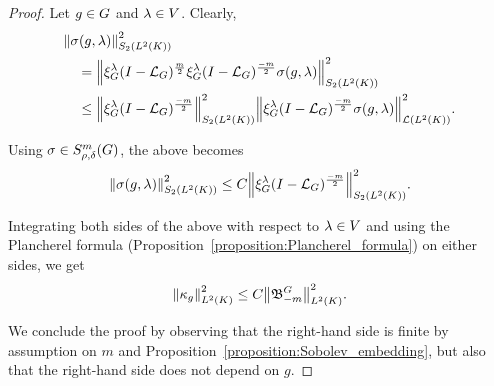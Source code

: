 \begin{proof}
    Let $g \in \Group$ and $\lambda \in \VectorSpace$.
    Clearly,
    \begin{align*}
        &\norm [\SchattenClasses 2 {\Lebesgue 2 \CompactGroup}] {\sigma(g, \lambda)}^2\\
        &\quad= \norm [\SchattenClasses 2 {\Lebesgue 2 \CompactGroup}] {\Rep \lambda \BesselPotential m \Rep \lambda \BesselPotential {-m} \sigma(g, \lambda)}^2\\
        &\quad\leq
        \norm [\SchattenClasses 2 {\Lebesgue 2 \CompactGroup}] {\Rep \lambda \BesselPotential {-m}}^2
        \norm [\Lin {\Lebesgue 2 \CompactGroup}] {\Rep \lambda \BesselPotential {-m} \sigma(g, \lambda)}^2.
    \end{align*}

    Using $\sigma \in \SymbolClass m {\rho, \delta}$,
    the above becomes
    \begin{align*}
        \norm [\SchattenClasses 2 {\Lebesgue 2 \CompactGroup}] {\sigma(g, \lambda)}^2
        \leq C \norm [\SchattenClasses 2 {\Lebesgue 2 \CompactGroup}] {\Rep \lambda \BesselPotential {-m}}^2.
    \end{align*}

    Integrating both sides of the above with respect to $\lambda \in \VectorSpace$
    and using the Plancherel formula (Proposition~\ref{proposition:Plancherel_formula}) on either sides,
    we get
    \begin{align*}
        \norm [\Lebesgue 2 \CompactGroup] {\kappa_g}^2 \leq C \norm [\Lebesgue 2 \CompactGroup] {\BesselPotentialKernel {-m}}^2.
    \end{align*}

    We conclude the proof by observing that the right-hand side is finite by assumption on $m$ and Proposition~\ref{proposition:Sobolev_embedding},
    but also that the right-hand side does not depend on $g$.
\end{proof}

